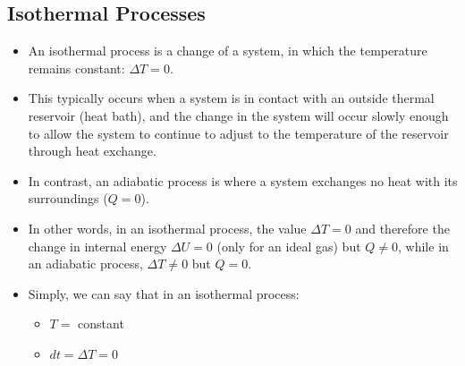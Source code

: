 \documentclass[]{article}
\begin{document}
\subsection{Isothermal Processes}
\begin{itemize}
\item An isothermal process is a change of a system, in which the temperature remains constant: $\Delta T =0$.
\item  This typically occurs when a system is in contact with an outside thermal reservoir (heat bath), and the change in the system will occur slowly enough to allow the system to continue to adjust to the temperature of the reservoir through heat exchange.
\item In contrast, an adiabatic process is where a system exchanges no heat with its surroundings ($Q = 0$).
\item In other words, in an isothermal process, the value $\Delta T = 0$ and therefore the change in internal energy $\Delta U = 0$ (only for an ideal gas) but $Q \neq 0$, while in an adiabatic process, $\Delta T \neq 0$ but $Q = 0$.
\item Simply, we can say that in an isothermal process:
\begin{itemize}
\item $T = $ constant
\item $dt = \Delta T = 0$
\end{itemize}
\end{itemize}
\end{document}
